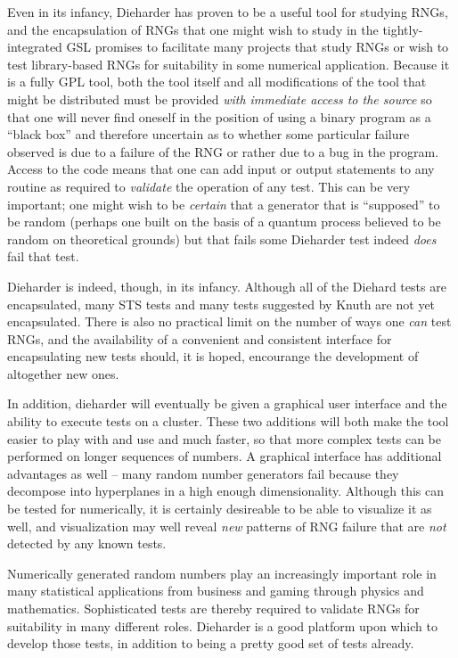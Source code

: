 \documentclass[12pt]{article}
\begin{document}
Even in its infancy, Dieharder has proven to be a useful tool for
studying RNGs, and the encapsulation of RNGs that one might wish to
study in the tightly-integrated GSL promises to facilitate many projects
that study RNGs or wish to test library-based RNGs for suitability in
some numerical application.  Because it is a fully GPL tool, both the
tool itself and all modifications of the tool that might be distributed
must be provided {\em with immediate access to the source} so that one
will never find oneself in the position of using a binary program as a
``black box'' and therefore uncertain as to whether some particular
failure observed is due to a failure of the RNG or rather due to a bug
in the program.  Access to the code means that one can add input or
output statements to any routine as required to {\em validate} the
operation of any test.  This can be very important; one might wish to be
{\em certain} that a generator that is ``supposed'' to be random
(perhaps one built on the basis of a quantum process believed to be
random on theoretical grounds) but that fails some Dieharder test indeed
{\em does} fail that test.

Dieharder is indeed, though, in its infancy.  Although all of the
Diehard tests are encapsulated, many STS tests and many tests suggested
by Knuth are not yet encapsulated.  There is also no practical limit on
the number of ways one {\em can} test RNGs, and the availability of a
convenient and consistent interface for encapsulating new tests should,
it is hoped, encourange the development of altogether new ones.

In addition, dieharder will eventually be given a graphical user
interface and the ability to execute tests on a cluster.  These two
additions will both make the tool easier to play with and use and much
faster, so that more complex tests can be performed on longer sequences
of numbers.  A graphical interface has additional advantages as well --
many random number generators fail because they decompose into
hyperplanes in a high enough dimensionality.  Although this can be
tested for numerically, it is certainly desireable to be able to
visualize it as well, and visualization may well reveal {\em new}
patterns of RNG failure that are {\em not} detected by any known tests.

Numerically generated random numbers play an increasingly important role
in many statistical applications from business and gaming through
physics and mathematics.  Sophisticated tests are thereby required to
validate RNGs for suitability in many different roles.  Dieharder is a
good platform upon which to develop those tests, in addition to being a
pretty good set of tests already.
\end{document}
